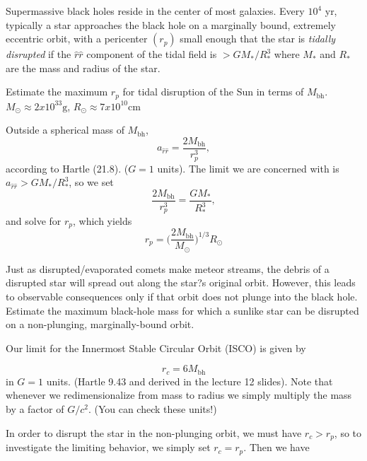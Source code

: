 \documentclass[11pt,largemargins]{homework}
\begin{document}
\question
Supermassive black holes reside in the center of most galaxies.  Every $10^4$ yr, typically a star approaches the black hole on a marginally bound, extremely eccentric orbit, with a pericenter $(r_p)$ small enough that the star is \textit{tidally disrupted} if the $\hat{r}\hat{r}$ component of the tidal field is $>GM_{*}/R_{*}^{3}$ where $M_*$ and $R_*$ are the mass and radius of the star.
\begin{alphaparts}
\questionpart
Estimate the maximum $r_p$ for tidal disruption of the Sun in terms of $M_{\mathrm{bh}}$.  $M_{\odot} \approx 2 x 10^{33} \mathrm{g}$, $R_{\odot} \approx 7 x 10^{10} \mathrm{cm}$

Outside a spherical mass of $M_{\mathrm{bh}}$,
\begin{equation}
a_{\hat{r}\hat{r}} = \frac{2M_{\mathrm{bh}}}{r_{p}^{3}},
\end{equation}
according to Hartle (21.8). ($G = 1$ units).  The limit we are concerned with is $a_{\hat{r}\hat{r}} > GM_{*}/R_{*}^{3}$, so we set 
\begin{equation}
\frac{2M_{\mathrm{bh}}}{r_{p}^{3}} = \frac{G M_{*}}{R_{*}^{3}},
\end{equation} 
and solve for $r_{p}$, which yields
\begin{equation}
r_{p} = \bigg(\frac{2 M_\mathrm{bh}}{M_{\odot}} \bigg) ^ {1/3} R_{\odot}
\end{equation}

\questionpart
Just as disrupted/evaporated comets make meteor streams, the debris of a disrupted
star will spread out along the star?s original orbit. However, this leads to
observable consequences only if that orbit does not plunge into the black hole. Estimate the maximum black-hole mass for which a sunlike star can be disrupted on a
non-plunging, marginally-bound orbit.

Our limit for the Innermost Stable Circular Orbit (ISCO) is given by 

\begin{equation}
r_{c} = 6M_{\mathrm{bh}}
\end{equation}
in $G = 1$ units.  (Hartle 9.43 and derived in the lecture 12 slides).  Note that whenever we redimensionalize from mass to radius we simply multiply the mass by a factor of $G/c^2$.  (You can check these units!)

In order to disrupt the star in the non-plunging orbit, we must have $r_{c} > r_{p}$, so to investigate the limiting behavior, we simply set $r_{c} = r_{p}$.  Then we have


\end{alphaparts}
\end{document}
